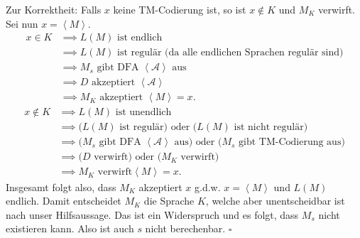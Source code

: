 \documentclass[11pt,a4paper]{article}
\newcommand{\qed}{\hfill\(\square\)}
\begin{document}
Zur Korrektheit: Falls \( x \) keine TM-Codierung ist, so ist \( x \notin K \) und \( M_K \) verwirft. Sei nun \( x = \left\langle M \right\rangle \).
\begin{align*}
	x \in K &\implies L(M) \text{ ist endlich}\\
		&\implies L(M) \text{ ist regul\"ar (da alle endlichen Sprachen regul\"ar sind)}\\
		&\implies M_s \text{ gibt DFA } \left\langle \mathcal{A} \right\rangle \text{ aus}\\
		&\implies D \text{ akzeptiert } \left\langle \mathcal{A} \right\rangle\\
		&\implies M_K \text{ akzeptiert } \left\langle M \right\rangle = x.
\end{align*}
\begin{align*}
	x \notin K &\implies L(M) \text{ ist unendlich}\\
		&\implies \text{(} L(M) \text{ ist regul\"ar) oder (} L(M) \text{ ist nicht regul\"ar)}\\
		&\implies \text{(} M_s \text{ gibt DFA } \left\langle \mathcal{A} \right\rangle \text{ aus) oder (} M_s \text{ gibt TM-Codierung aus)}\\
		&\implies \text{(} D \text{ verwirft) oder (} M_K \text{ verwirft)}\\
		&\implies M_K \text{ verwirft} \left\langle M \right\rangle = x.
\end{align*}
Insgesamt folgt also, dass \( M_K \) akzeptiert \( x \) {g.d.w.} \( x = \left\langle M \right\rangle \) und \( L(M) \) endlich. Damit entscheidet \( M_K \) die Sprache \( K \), welche aber unentscheidbar ist nach unser Hilfsaussage. Das ist ein Widerspruch und es folgt, dass \( M_s \) nicht existieren kann. Also ist auch \( s \) nicht berechenbar. \qed
\end{document}
